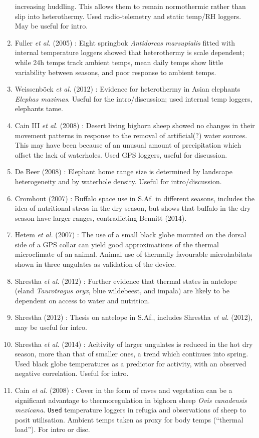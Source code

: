 \documentclass[10pt,twocolumn]{paper}
\begin{document}
\begin{enumerate}
  increasing huddling. This allows them to remain normothermic rather
  than slip into heterothermy. Used radio-telemetry and static temp/RH
  loggers. May be useful for intro.
\item
  Fuller \emph{et al.} (2005) : Eight springbok \emph{Antidorcas
  marsupialis} fitted with internal temperature loggers showed that
  heterothermy is scale dependent; while 24h temps track ambient temps,
  mean daily temps show little variability between seasons, and poor
  response to ambient temps.
\item
  Weissenböck \emph{et al.} (2012) : Evidence for heterothermy in Asian
  elephants \emph{Elephas maximas}. Useful for the intro/discussion;
  used internal temp loggers, elephants tame.
\item
  Cain III \emph{et al.} (2008) : Desert living bighorn sheep showed no
  changes in their movement patterns in response to the removal of
  artificial(?) water sources. This may have been because of an unusual
  amount of precipitation which offset the lack of waterholes. Used GPS
  loggers, useful for discussion.
\item
  De Beer (2008) : Elephant home range size is determined by landscape
  heterogeneity and by waterhole density. Useful for intro/discussion.
\item
  Cromhout (2007) : Buffalo space use in S.Af. in different seasons,
  includes the idea of nutritional stress in the dry season, but shows
  that buffalo in the dry season have larger ranges, contradicting
  Bennitt (2014).
\item
  Hetem \emph{et al.} (2007) : The use of a small black globe mounted on
  the dorsal side of a GPS collar can yield good approximations of the
  thermal microclimate of an animal. Animal use of thermally favourable
  microhabitats shown in three ungulates as validation of the device.
\item
  Shrestha \emph{et al.} (2012) : Further evidence that thermal states
  in antelope (eland \emph{Taurotragus oryx}, blue wildebeest, and
  impala) are likely to be dependent on access to water and nutrition.
\item
  Shrestha (2012) : Thesis on antelope in S.Af., includes Shrestha
  \emph{et al.} (2012), may be useful for intro.
\item
  Shrestha \emph{et al.} (2014) : Acitivity of larger ungulates is
  reduced in the hot dry season, more than that of smaller ones, a trend
  which continues into spring. Used black globe temperatures as a
  predictor for activity, with an observed negative correlation. Useful
  for intro.
\item
  Cain \emph{et al.} (2008) : Cover in the form of caves and vegetation
  can be a significant advantage to thermoregulation in bighorn sheep
  \emph{Ovis canadensis mexicana}. \texttt{Used} temperature loggers in
  refugia and observations of sheep to posit utilisation. Ambient temps
  taken as proxy for body temps (``thermal load''). For intro or disc.
\end{enumerate}
\end{document}
